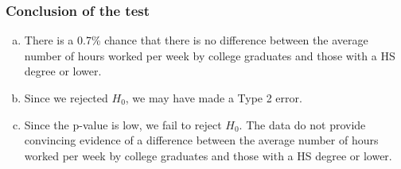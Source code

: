 \begin{frame}
\frametitle{Conclusion of the test}


{\small
\begin{enumerate}[(a)]
\item There is a 0.7\% chance that there is no difference between the average number of hours worked per week by college graduates and those with a HS degree or lower.
\item Since we rejected $H_0$, we may have made a Type 2 error.
\item Since the p-value is low, we fail to reject $H_0$. The data do not provide convincing evidence of a difference between the average number of hours worked per week by college graduates and those with a HS degree or lower.
\end{enumerate}
}

\end{frame}

